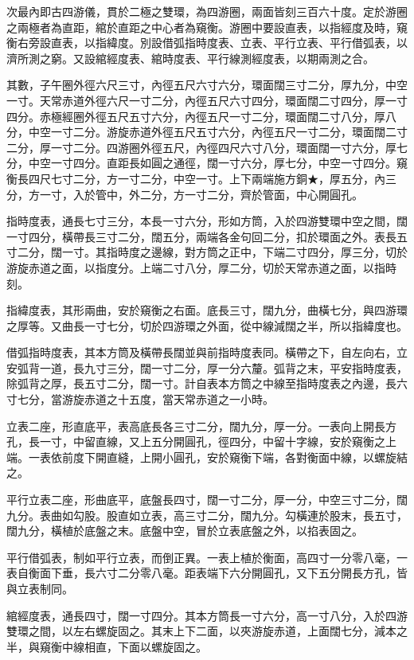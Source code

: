 \begin{pinyinscope}
次最內即古四游儀，貫於二極之雙環，為四游圈，兩面皆刻三百六十度。定於游圈之兩極者為直距，綰於直距之中心者為窺衡。游圈中要設直表，以指經度及時，窺衡右旁設直表，以指緯度。別設借弧指時度表、立表、平行立表、平行借弧表，以濟所測之窮。又設綰經度表、綰時度表、平行線測經度表，以期兩測之合。

其數，子午圈外徑六尺三寸，內徑五尺六寸六分，環面闊三寸二分，厚九分，中空一寸。天常赤道外徑六尺一寸二分，內徑五尺六寸四分，環面闊二寸四分，厚一寸四分。赤極經圈外徑五尺五寸六分，內徑五尺一寸二分，環面闊二寸八分，厚八分，中空一寸二分。游旋赤道外徑五尺五寸六分，內徑五尺一寸二分，環面闊二寸二分，厚一寸二分。四游圈外徑五尺，內徑四尺六寸八分，環面闊一寸六分，厚七分，中空一寸四分。直距長如圓之通徑，闊一寸六分，厚七分，中空一寸四分。窺衡長四尺七寸二分，方一寸二分，中空一寸。上下兩端施方銅★，厚五分，內三分，方一寸，入於管中，外二分，方一寸二分，齊於管面，中心開圓孔。

指時度表，通長七寸三分，本長一寸六分，形如方筒，入於四游雙環中空之間，闊一寸四分，橫帶長三寸二分，闊五分，兩端各金句回二分，扣於環面之外。表長五寸二分，闊一寸。其指時度之邊線，對方筒之正中，下端二寸四分，厚三分，切於游旋赤道之面，以指度分。上端二寸八分，厚二分，切於天常赤道之面，以指時刻。

指緯度表，其形兩曲，安於窺衡之右面。底長三寸，闊九分，曲橫七分，與四游環之厚等。又曲長一寸七分，切於四游環之外面，從中線減闊之半，所以指緯度也。

借弧指時度表，其本方筒及橫帶長闊並與前指時度表同。橫帶之下，自左向右，立安弧背一道，長九寸三分，闊一寸二分，厚一分六釐。弧背之末，平安指時度表，除弧背之厚，長五寸二分，闊一寸。計自表本方筒之中線至指時度表之內邊，長六寸七分，當游旋赤道之十五度，當天常赤道之一小時。

立表二座，形直底平，表高底長各三寸二分，闊九分，厚一分。一表向上開長方孔，長一寸，中留直線，又上五分開圓孔，徑四分，中留十字線，安於窺衡之上端。一表依前度下開直縫，上開小圓孔，安於窺衡下端，各對衡面中線，以螺旋結之。

平行立表二座，形曲底平，底盤長四寸，闊一寸二分，厚一分，中空三寸二分，闊九分。表曲如勾股。股直如立表，高三寸二分，闊九分。勾橫連於股末，長五寸，闊九分，橫植於底盤之末。底盤中空，冒於立表底盤之外，以掐表固之。

平行借弧表，制如平行立表，而倒正異。一表上植於衡面，高四寸一分零八毫，一表自衡面下垂，長六寸二分零八毫。距表端下六分開圓孔，又下五分開長方孔，皆與立表制同。

綰經度表，通長四寸，闊一寸四分。其本方筒長一寸六分，高一寸八分，入於四游雙環之間，以左右螺旋固之。其末上下二面，以夾游旋赤道，上面闊七分，減本之半，與窺衡中線相直，下面以螺旋固之。


\end{pinyinscope}
